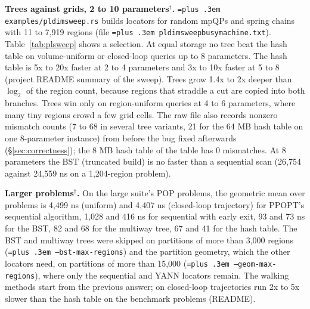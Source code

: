 \documentclass[10pt,a4paper]{article}
\newcommand{\busy}{$^\dagger$}
\newcommand{\sizenote}{Size is $n_\theta/n_x/m$: parameters, variables, constraints (Table~\ref{tab:sizes}).}
\newcommand{\ppopt}{PPOPT}
\newcommand{\code}[1]{{\let\_\bu\texttt{\spaceskip=\fontdimen2\font plus .3em #1}}}
\newcommand{\bu}{\textunderscore\hspace{0pt}}
\begin{document}

\begin{table}[!htbp]
\centering\small\setlength{\tabcolsep}{4pt}
\caption{Point location, ns per query, 100,000 uniform queries. All methods agree with sequential search on every query. Omitted column: \linmachnote. \sizenote}
\label{tab:plmethods}

\end{table}

\textbf{Trees against grids, 2 to 10 parameters\busy{}.} \code{examples/pl\_dim\_sweep.rs} builds locators for random mpQPs and spring chains with 11 to 7,919 regions
(file \code{pl\_dim\_sweep\_busy\_machine.txt}). Table~\ref{tab:plsweep} shows a selection. At equal storage no tree beat the hash table on volume-uniform or closed-loop queries up to 8
parameters. The hash table is 5x to 20x faster at 2 to 4 parameters and 3x to 10x faster at 5 to 8 (project README summary of the sweep). Trees grow 1.4x
to 2x deeper than $\log_2$ of the region count, because regions that straddle a cut are copied into both branches. Trees win only on region-uniform queries at 4 to 6 parameters, where many tiny regions crowd
a few grid cells. The raw file also records nonzero mismatch counts (7 to 68 in several tree variants, 21 for the 64 MB hash table on one 8-parameter instance) from before the
bug fixed afterwards (\S\ref{sec:correctness}); the 8 MB hash table of the table has 0 mismatches. At 8 parameters the BST (truncated build) is no
faster than a sequential scan (26,754 against 24,559 ns on a 1,204-region problem).

\begin{table}[!htbp]
\centering\small\setlength{\tabcolsep}{4pt}
\caption{Point location by parameter count\busy{}, ns per volume-uniform query (selected instances). An asterisk marks a tree whose build was truncated at 45 s. Instance names: \code{qp:$n_x$:$n_\theta$:$m$:seed} are random mpQPs, \code{mass:k:n} spring chains. The mismatch column for the 8 MB hash table is omitted: it is 0 on every listed instance.}
\label{tab:plsweep}

\end{table}

\textbf{Larger problems\busy{}.} On the large suite's POP problems, the geometric mean over problems is 4,499 ns (uniform) and 4,407 ns (closed-loop trajectory) for
\ppopt{}'s sequential algorithm, 1,028 and 416 ns for sequential with early exit, 93 and 73 ns for the BST, 82 and 68 for the multiway tree, 67 and 41 for the hash table. The
BST and multiway trees were skipped on partitions of more than 3,000 regions (\code{--bst-max-regions}) and the partition geometry, which the other locators need, on partitions of more than 15,000
(\code{--geom-max-regions}), where only the sequential and YANN locators remain. The walking methods start from the previous answer; on closed-loop
trajectories run 2x to 5x slower than the hash table on the benchmark problems (README).
\end{document}
